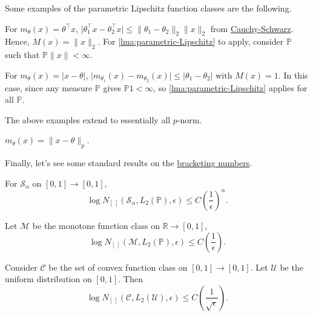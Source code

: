 Some examples of the parametric Lipschitz function classes are the following.

\begin{eg}
	For \(m_\theta (x) = \theta ^{\top} x\), \(\vert \theta _1 ^{\top} x - \theta _2 ^{\top} x \vert \leq \lVert \theta _1 - \theta _2 \rVert _2 \lVert x \rVert _2\) from \href{https://en.wikipedia.org/wiki/Cauchy-Schwarz_inequality}{Cauchy-Schwarz}. Hence, \(M(x) = \lVert x \rVert _2\). For \autoref{lma:parametric-Lipschitz} to apply, consider \(\mathbb{P} \) such that \(\mathbb{P} \lVert x \rVert < \infty \).
\end{eg}

\begin{eg}
	For \(m_\theta (x) = \vert x - \theta \vert \), \(\vert m_{\theta _1}(x) - m_{\theta _2}(x) \vert \leq \vert \theta _1 - \theta _2 \vert \) with \(M(x) =1\). In this case, since any measure \(\mathbb{P} \) gives \(\mathbb{P} 1 < \infty \), so \autoref{lma:parametric-Lipschitz} applies for all \(\mathbb{P} \).
\end{eg}

The above examples extend to essentially all \(p\)-norm.

\begin{eg}
	\(m_\theta (x) = \lVert x - \theta  \rVert _p\).
\end{eg}

Finally, let's see some standard results on the \hyperref[def:bracketing-number]{bracketing numbers}.

\begin{eg}
	For \(\mathcal{S} _\alpha \) on \([0, 1] \to [0, 1]\),
	\[
		\log N_{[\ ]}(\mathcal{S} _\alpha , L_2(\mathbb{P} ), \epsilon )
		\leq C\left( \frac{1}{\epsilon } \right) ^\alpha .
	\]
\end{eg}

\begin{eg}
	Let \(\mathcal{M} \) be the monotone function class on \(\mathbb{R} \to [0, 1]\),
	\[
		\log N_{[\ ]}(\mathcal{M} , L_2(\mathbb{P} ), \epsilon )
		\leq C \left( \frac{1}{\epsilon } \right).
	\]
\end{eg}

\begin{eg}
	Consider \(\mathcal{C} \) be the set of convex function class on \([0, 1] \to [0, 1]\). Let \(\mathcal{U} \) be the uniform distribution on \([0, 1]\). Then
	\[
		\log N_{[\ ]}(\mathscr{C} , L_2(\mathcal{U} ), \epsilon )
		\leq C \left( \frac{1}{\sqrt{\epsilon } } \right) .
	\]
\end{eg}

